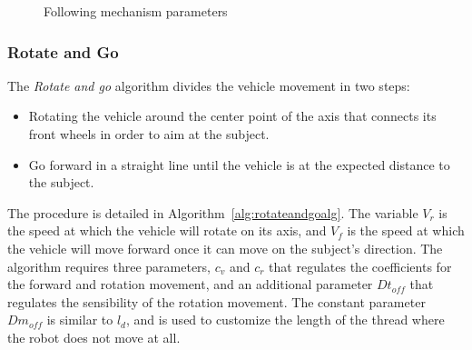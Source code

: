 \documentclass[journal]{IEEEtran}
\begin{document}
\begin{figure}[]
    \caption{Following mechanism parameters}
    \label{fig:follow_params}
\end{figure}{}

\subsubsection{Rotate and Go}

The \textit{Rotate and go} algorithm divides the vehicle movement in two steps:

\begin{itemize}
\item Rotating the vehicle around the center point of the axis that connects its front wheels in order to aim at the subject.
\item Go forward in a straight line until the vehicle is at the expected distance to the subject.
\end{itemize}

The procedure is detailed in Algorithm~\ref{alg:rotateandgoalg}.  The variable $V_r$ is the speed at which the vehicle will rotate on its axis, and $V_f$ is the speed at which the vehicle will move forward once it can move on the subject's direction.  The algorithm requires three parameters, $c_v$ and $c_r$ that regulates the coefficients for the forward and rotation movement, and an additional parameter $Dt_{off}$ that regulates the sensibility of the rotation movement.  The constant parameter $Dm_{off}$ is similar to $l_d$, and is used to customize the length of the thread where the robot does not move at all.
\end{document}
